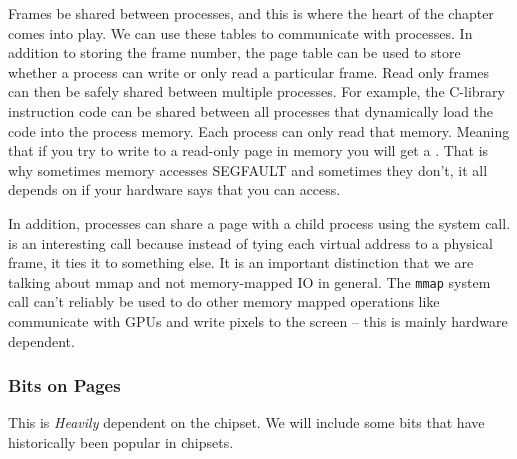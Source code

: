 Frames be shared between processes, and this is where the heart of the chapter comes into play.
We can use these tables to communicate with processes.
In addition to storing the frame number, the page table can be used to store whether a process can write or only read a particular frame.
Read only frames can then be safely shared between multiple processes.
For example, the C-library instruction code can be shared between all processes that dynamically load the code into the process memory.
Each process can only read that memory.
Meaning that if you try to write to a read-only page in memory you will get a .
That is why sometimes memory accesses SEGFAULT and sometimes they don't, it all depends on if your hardware says that you can access.

In addition, processes can share a page with a child process using the  system call.
 is an interesting call because instead of tying each virtual address to a physical frame, it ties it to something else. It is an important distinction that we are talking about mmap and not memory-mapped IO in general. The \texttt{mmap} system call can't reliably be used to do other memory mapped operations like communicate with GPUs and write pixels to the screen -- this is mainly hardware dependent.

\subsubsection{Bits on Pages}

This is \textit{Heavily} dependent on the chipset.
We will include some bits that have historically been popular in chipsets.

